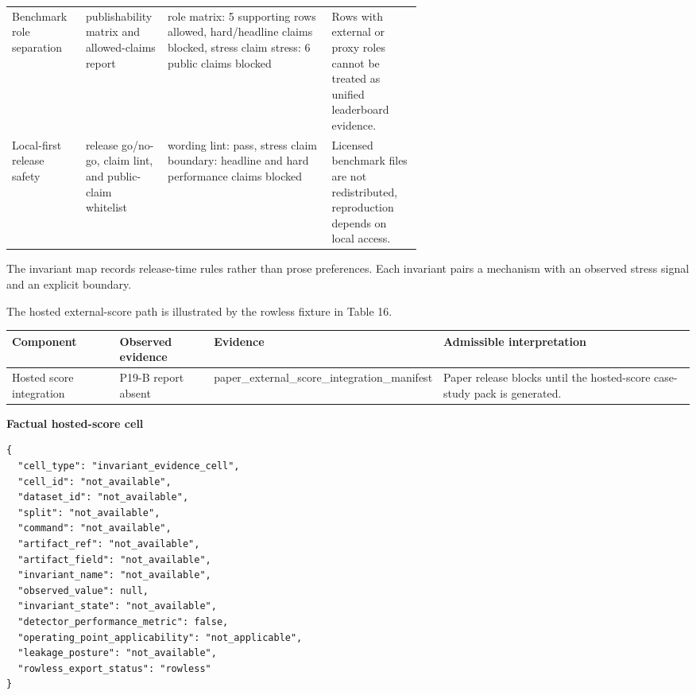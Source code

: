\documentclass[11pt]{article}
\begin{document}
\begin{center}
\begin{minipage}{\linewidth}
\begin{tabularx}{\linewidth}{@{}>{\raggedright\arraybackslash}p{0.18\linewidth} >{\raggedright\arraybackslash}p{0.20\linewidth} >{\raggedright\arraybackslash}X >{\raggedright\arraybackslash}p{0.22\linewidth}@{}}
Benchmark role separation & publishability matrix and allowed-claims report & role matrix: 5 supporting rows allowed, hard/headline claims blocked, stress claim stress: 6 public claims blocked & Rows with external or proxy roles cannot be treated as unified leaderboard evidence. \\
Local-first release safety & release go/no-go, claim lint, and public-claim whitelist & wording lint: pass, stress claim boundary: headline and hard performance claims blocked & Licensed benchmark files are not redistributed, reproduction depends on local access. \\
\bottomrule
\end{tabularx}
\end{minipage}
\end{center}


The invariant map records release-time rules rather than prose preferences. Each invariant pairs a mechanism with an observed stress signal and an explicit boundary.

The hosted external-score path is illustrated by the rowless fixture in Table 16.

\begin{center}
\begin{minipage}{\linewidth}
\small
\setlength{\tabcolsep}{3pt}
\renewcommand{\arraystretch}{1.16}
\begin{tabularx}{\linewidth}{@{}>{\raggedright\arraybackslash}X >{\raggedright\arraybackslash}X >{\raggedright\arraybackslash}X >{\raggedright\arraybackslash}X@{}}
\toprule
Component & Observed evidence & Evidence & Admissible interpretation \\
\midrule
Hosted score integration & P19-B report absent & paper\_external\_score\_integration\_manifest & Paper release blocks until the hosted-score case-study pack is generated. \\
\bottomrule
\end{tabularx}
\end{minipage}
\end{center}


\textbf{Factual hosted-score cell}

\begin{Verbatim}[frame=single,framesep=6pt,fontsize=\footnotesize,breaklines=true,breakanywhere=true]
{
  "cell_type": "invariant_evidence_cell",
  "cell_id": "not_available",
  "dataset_id": "not_available",
  "split": "not_available",
  "command": "not_available",
  "artifact_ref": "not_available",
  "artifact_field": "not_available",
  "invariant_name": "not_available",
  "observed_value": null,
  "invariant_state": "not_available",
  "detector_performance_metric": false,
  "operating_point_applicability": "not_applicable",
  "leakage_posture": "not_available",
  "rowless_export_status": "rowless"
}
\end{Verbatim}
\end{document}
